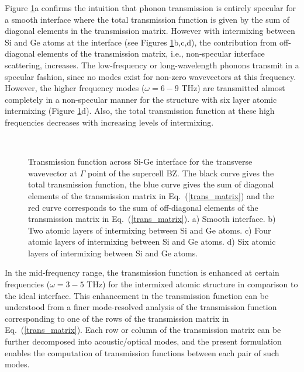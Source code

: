 \documentclass[11pt]{article}
\begin{document}
Figure \ref{trans_spec}a confirms the intuition that phonon transmission is entirely specular for a smooth interface where the total transmission function is given by the sum of diagonal elements in the transmission matrix. However with intermixing between Si and Ge atoms at the interface (see Figures \ref{trans_spec}b,c,d), the contribution from off-diagonal elements of the transmission matrix, i.e., non-specular interface scattering, increases. The low-frequency or long-wavelength phonons transmit in a specular fashion, since no modes exist for non-zero wavevectors at this frequency. However, the higher frequency modes ($\omega=6-9$ THz) are transmitted almost completely in a non-specular manner for the structure with six layer atomic intermixing (Figure \ref{trans_spec}d). Also, the total transmission function at these high frequencies decreases with increasing levels of intermixing. 

\begin{figure}
\centering
{}
\\
\caption{Transmission function across Si-Ge interface for the transverse wavevector at $\Gamma$ point of the supercell BZ. The black curve gives the total transmission function, the blue curve gives the sum of diagonal elements of the transmission matrix in Eq.~(\ref{trans_matrix}) and the red curve corresponds to the sum of off-diagonal elements of the transmission matrix in Eq.~(\ref{trans_matrix}). a) Smooth interface. b) Two atomic layers of intermixing between Si and Ge atoms. c) Four atomic layers of intermixing between Si and Ge atoms. d) Six atomic layers of intermixing between Si and Ge atoms.}\label{trans_spec}
\end{figure}

In the mid-frequency range, the transmission function is enhanced at certain frequencies ($\omega=3-5$ THz) for the intermixed atomic structure in comparison to the ideal interface. This enhancement in the transmission function can be understood from a finer mode-resolved analysis of the transmission function corresponding to one of the rows of the transmission matrix in Eq.~(\ref{trans_matrix}). Each row or column of the transmission matrix can be further decomposed into acoustic/optical modes, and the present formulation enables the computation of transmission functions between each pair of such modes. 
\end{document}
